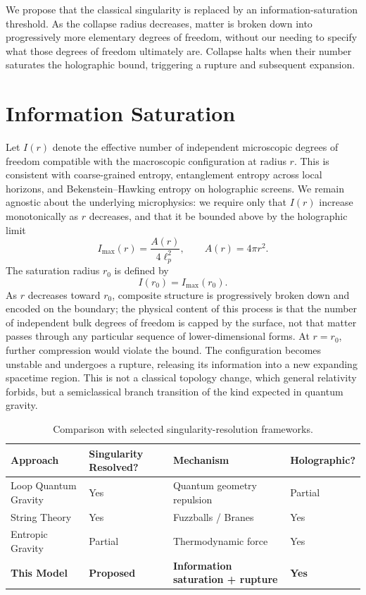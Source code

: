 \documentclass[onecolumn,PRD,amsmath,amssymb,aps,nofootinbib,superscriptaddress,11pt]{revtex4-2}
\begin{document}
We propose that the classical singularity is replaced by an information-saturation threshold. As the collapse radius decreases, matter is broken down into progressively more elementary degrees of freedom, without our needing to specify what those degrees of freedom ultimately are. Collapse halts when their number saturates the holographic bound, triggering a rupture and subsequent expansion.

\section{Information Saturation}
Let $I(r)$ denote the effective number of independent microscopic degrees of freedom compatible with the macroscopic configuration at radius $r$. This is consistent with coarse-grained entropy, entanglement entropy across local horizons, and Bekenstein--Hawking entropy on holographic screens. We remain agnostic about the underlying microphysics: we require only that $I(r)$ increase monotonically as $r$ decreases, and that it be bounded above by the holographic limit
\begin{equation}
I_{\max}(r) = \frac{A(r)}{4\ell_p^2}, \qquad A(r) = 4\pi r^2 .
\end{equation}
The saturation radius $r_0$ is defined by
\begin{equation}
I(r_0) = I_{\max}(r_0).
\end{equation}
As $r$ decreases toward $r_0$, composite structure is progressively broken down and encoded on the boundary; the physical content of this process is that the number of independent bulk degrees of freedom is capped by the surface, not that matter passes through any particular sequence of lower-dimensional forms. At $r=r_0$, further compression would violate the bound. The configuration becomes unstable and undergoes a rupture, releasing its information into a new expanding spacetime region. This is not a classical topology change, which general relativity forbids, but a semiclassical branch transition of the kind expected in quantum gravity.

\begin{table}[h]
\caption{Comparison with selected singularity-resolution frameworks.}
\label{tab:frameworks}
\begin{ruledtabular}
\begin{tabular}{llll}
Approach & Singularity Resolved? & Mechanism & Holographic? \\ \hline
Loop Quantum Gravity & Yes & Quantum geometry repulsion & Partial \\
String Theory & Yes & Fuzzballs / Branes & Yes \\
Entropic Gravity & Partial & Thermodynamic force & Yes \\
\textbf{This Model} & \textbf{Proposed} & \textbf{Information saturation + rupture} & \textbf{Yes} \\
\end{tabular}
\end{ruledtabular}
\end{table}
\end{document}
